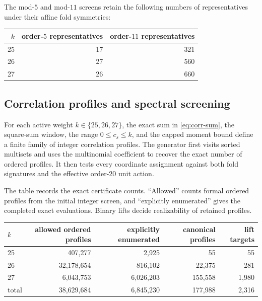 \documentclass[11pt,a4paper]{article}
\theoremstyle{remark}
\begin{document}
The mod-$5$ and mod-$11$ screens retain the following numbers of
representatives under their affine fold symmetries:
\begin{center}
\small
\begin{tabular}{@{}rrr@{}}
\toprule
$k$ & order-$5$ representatives & order-$11$ representatives\\
\midrule
25 & 17 & 321\\
26 & 27 & 560\\
27 & 26 & 660\\
\bottomrule
\end{tabular}
\end{center}

\subsection{Correlation profiles and spectral screening}


For each active weight $k\in\{25,26,27\}$, the exact sum in
\eqref{eq:corr-sum}, the square-sum window, the range $0\leq c_s\leq k$, and
the capped moment bound define a finite family of integer correlation
profiles.  The generator first visits sorted multisets and uses the
multinomial coefficient to recover the exact number of ordered profiles.
It then tests every coordinate assignment against both fold signatures and
the effective order-$20$ unit action.

The table records the exact certificate counts.
``Allowed'' counts formal ordered profiles from the initial integer
screen, and ``explicitly enumerated'' gives the completed exact
evaluations.  Binary lifts decide realizability of retained profiles.
\begin{center}
\scriptsize
\setlength{\tabcolsep}{4pt}
\begin{tabular}{@{}lrrrr@{}}
\toprule
$k$ & allowed ordered profiles & explicitly enumerated & canonical profiles & lift targets\\
\midrule
25 & 407,277 & 2,925 & 55 & 55\\
26 & 32,178,654 & 816,102 & 22,375 & 281\\
27 & 6,043,753 & 6,026,203 & 155,558 & 1,980\\
\midrule
total & 38,629,684 & 6,845,230 & 177,988 & 2,316\\
\bottomrule
\end{tabular}
\end{center}
\end{document}
